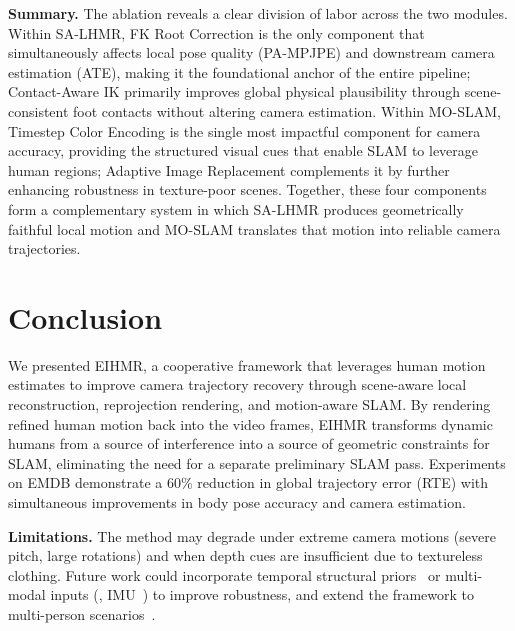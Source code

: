 \noindent\textbf{Summary.}
The ablation reveals a clear division of labor across the two modules. Within SA-LHMR, FK Root Correction is the only component that simultaneously affects local pose quality (PA-MPJPE) and downstream camera estimation (ATE), making it the foundational anchor of the entire pipeline; Contact-Aware IK primarily improves global physical plausibility through scene-consistent foot contacts without altering camera estimation. Within MO-SLAM, Timestep Color Encoding is the single most impactful component for camera accuracy, providing the structured visual cues that enable SLAM to leverage human regions; Adaptive Image Replacement complements it by further enhancing robustness in texture-poor scenes. Together, these four components form a complementary system in which SA-LHMR produces geometrically faithful local motion and MO-SLAM translates that motion into reliable camera trajectories.


\section{Conclusion}
\label{sec:conclusion}

We presented EIHMR, a cooperative framework that leverages human motion estimates to improve camera trajectory recovery through scene-aware local reconstruction, reprojection rendering, and motion-aware SLAM. By rendering refined human motion back into the video frames, EIHMR transforms dynamic humans from a source of interference into a source of geometric constraints for SLAM, eliminating the need for a separate preliminary SLAM pass. Experiments on EMDB demonstrate a 60\% reduction in global trajectory error (RTE) with simultaneous improvements in body pose accuracy and camera estimation.

\noindent\textbf{Limitations.}
The method may degrade under extreme camera motions (severe pitch, large rotations) and when depth cues are insufficient due to textureless clothing. Future work could incorporate temporal structural priors~\cite{MDM2023,PhysDiff2023} or multi-modal inputs (\eg, IMU~\cite{WHAM2024}) to improve robustness, and extend the framework to multi-person scenarios~\cite{MultiHMR2024}.








